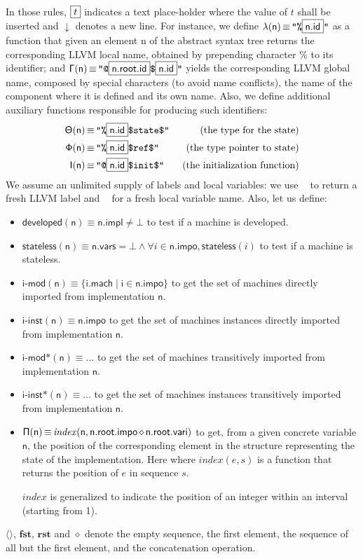 \documentclass{llncs}
\newcommand{\nl}[0]{\ensuremath{\downarrow}}
\DeclareMathOperator{\conc}{\diamond}
\DeclareMathOperator{\isdef}{\equiv}
\DeclareMathOperator{\lbl}{\mathcal{L}()}
\DeclareMathOperator{\variable}{\mathcal{V}()}
\newcommand{\llvm}[1]{\texttt{#1}}
\newcommand{\B}[1]{\textsf{#1}}
\newcommand{\PH}[1]{\framebox{$#1$}}
\newcommand{\Global}[0]{\ensuremath{\sf\Gamma}}
\newcommand{\local}[0]{\ensuremath{\sf\lambda}}
\newcommand{\developed}[0]{\ensuremath{\textsf{developed}}}
\newcommand{\stateless}[0]{\ensuremath{\textsf{stateless}}}
\newcommand{\importedmodules}[0]{\ensuremath{\textsf{i-mod}}}
\newcommand{\trimportedmodules}[0]{\ensuremath{\textsf{i-mod$\mathsf{\ast}$}}}
\newcommand{\importedinstances}[0]{\ensuremath{\textsf{i-inst}}}
\newcommand{\trimportedinstances}[0]{\ensuremath{\textsf{i-inst$\mathsf{\ast}$}}}
\newcommand{\idx}[0]{\ensuremath{\sf\Pi}}
\newcommand{\state}[0]{\ensuremath{\sf\Theta}}
\newcommand{\stateref}[0]{\ensuremath{\sf\Phi}}
\newcommand{\init}[0]{\ensuremath{\mathsf{I}}}
\begin{document}
In those rules, $\PH{t}$ indicates a text place-holder where the value of $t$
shall be inserted and $\nl$ denotes a new line. For instance, we define
$\local(\B{n}) \isdef \llvm{"\%\PH{\B{n.id}}"}$ as a function that given an
element \B{n} of the abstract syntax tree returns the corresponding LLVM local
name, obtained by prepending character \% to its identifier; and $\Global(\B{n})
\isdef \llvm{"@\PH{\B{n.root.id}}\$\PH{\B{n.id}}"}$ yields the corresponding
LLVM global name, composed by special characters (to avoid name conflicts), the
name of the component where it is defined and its own name.  Also, we define
additional auxiliary functions responsible for producing such identifiers:
\begin{align*}
\state(\B{n}) & \isdef \llvm{"\%\PH{\B{n.id}}\$state\$"} & \text{ (the type for the state)} \\
\stateref(\B{n}) & \isdef \llvm{"\%\PH{\B{n.id}}\$ref\$"} & \text{ (the type pointer to state)} \\
\init(\B{n}) & \isdef \llvm{"@\PH{\B{n.id}}\$init\$"} & \text{ (the initialization function)}
\end{align*}
We assume an unlimited supply of labels and local variables: we use $\lbl$ to
return a fresh LLVM label and $\variable$ for a fresh local variable name. Also, let us define:
\begin{itemize}
\item $\developed(\B{n}) \isdef \B{n.impl} \neq \bot$ to test if a machine is
  developed.
\item $\stateless(\B{n}) \isdef \B{n.vars} =  \bot \land \forall i \in \B{n.impo}, \stateless(i)$ to test if a machine is stateless.
\item $\importedmodules(\B{n}) \isdef \{ \B{i.mach} \mid \B{i} \in \B{n.impo}
  \}$ to get the set of machines directly imported from implementation $\B{n}$.
\item $\importedinstances(\B{n}) \isdef \B{n.impo}$ to get the set of machines
  instances directly imported from implementation $\B{n}$.
\item $\trimportedmodules(\B{n}) \isdef \ldots$ to get the set of machines
transitively imported from implementation $\B{n}$.
\item $\trimportedinstances(\B{n}) \isdef \ldots$ to get the set of machines
instances transitively imported from implementation $\B{n}$.
\item $\idx(\B{n}) \isdef \mathit{index}(\B{n}, \B{n.root.impo} \conc
  \B{n.root.vari})$ to get, from a given concrete variable $\B{n}$,
  the position of the corresponding element in the structure
  representing the state of the implementation. Here where
  $\mathit{index}(e, s)$ is a function that returns the position of
  $e$ in sequence $s$. 

  $index$ is generalized to indicate the position of an integer within
  an interval (starting from 1).
\end{itemize}
\newcommand{\mtyseq}[0]{\ensuremath{\langle \rangle}}
\newcommand{\fst}[0]{\ensuremath{\mathbf{fst}}}
\newcommand{\rst}[0]{\ensuremath{\mathbf{rst}}} $\mtyseq$, $\fst$,
$\rst$ and $\conc$ denote the empty sequence, the first element, the
sequence of all but the first element, and the concatenation
operation.
\end{document}
